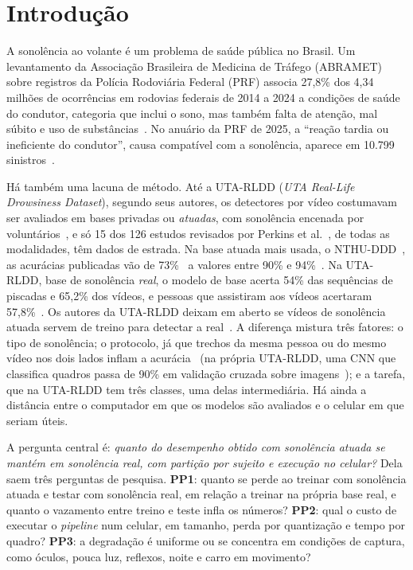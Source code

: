 \documentclass[conference]{IEEEtran}
\begin{document}
\section{Introdução}
\label{sec:intro}

A sonolência ao volante é um problema de saúde pública no Brasil. Um levantamento da Associação Brasileira de Medicina de Tráfego (ABRAMET) sobre registros da Polícia Rodoviária Federal (PRF) associa 27,8\% dos 4,34 milhões de ocorrências em rodovias federais de 2014 a 2024 a condições de saúde do condutor, categoria que inclui o sono, mas também falta de atenção, mal súbito e uso de substâncias~\cite{abramet2026}. No anuário da PRF de 2025, a ``reação tardia ou ineficiente do condutor'', causa compatível com a sonolência, aparece em 10.799 sinistros~\cite{prf2026}.

Há também uma lacuna de método. Até a UTA-RLDD (\emph{UTA Real-Life Drowsiness Dataset}), segundo seus autores, os detectores por vídeo costumavam ser avaliados em bases privadas ou \emph{atuadas}, com sonolência encenada por voluntários~\cite{ghoddoosian2019}, e só 15 dos 126 estudos revisados por Perkins et al.~\cite{perkins2023}, de todas as modalidades, têm dados de estrada. Na base atuada mais usada, o NTHU-DDD~\cite{weng2016}, as acurácias publicadas vão de 73\%~\cite{park2016} a valores entre 90\% e 94\%~\cite{lyu2018,shen2020}. Na UTA-RLDD, base de sonolência \emph{real}, o modelo de base acerta 54\% das sequências de piscadas e 65,2\% dos vídeos, e pessoas que assistiram aos vídeos acertaram 57,8\%~\cite{ghoddoosian2019}. Os autores da UTA-RLDD deixam em aberto se vídeos de sonolência atuada servem de treino para detectar a real~\cite{ghoddoosian2019}. A diferença mistura três fatores: o tipo de sonolência; o protocolo, já que trechos da mesma pessoa ou do mesmo vídeo nos dois lados inflam a acurácia~\cite{perkins2023} (na própria UTA-RLDD, uma CNN que classifica quadros passa de 90\% em validação cruzada sobre imagens~\cite{tamanani2021}); e a tarefa, que na UTA-RLDD tem três classes, uma delas intermediária. Há ainda a distância entre o computador em que os modelos são avaliados e o celular em que seriam úteis.

A pergunta central é: \emph{quanto do desempenho obtido com sonolência atuada se mantém em sonolência real, com partição por sujeito e execução no celular?} Dela saem três perguntas de pesquisa. \textbf{PP1}: quanto se perde ao treinar com sonolência atuada e testar com sonolência real, em relação a treinar na própria base real, e quanto o vazamento entre treino e teste infla os números? \textbf{PP2}: qual o custo de executar o \emph{pipeline} num celular, em tamanho, perda por quantização e tempo por quadro? \textbf{PP3}: a degradação é uniforme ou se concentra em condições de captura, como óculos, pouca luz, reflexos, noite e carro em movimento?
\end{document}
